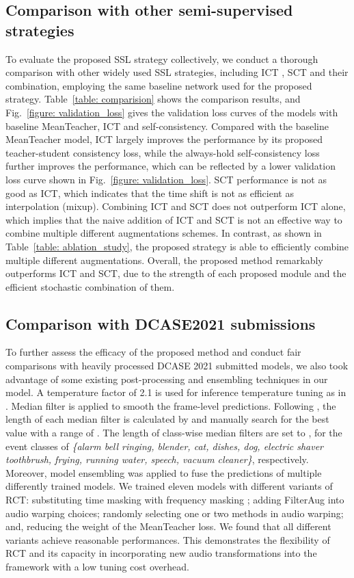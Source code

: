 \documentclass[a4paper]{article}
\begin{document}
\subsection{Comparison with other semi-supervised strategies}
To evaluate the proposed SSL strategy collectively, we conduct a thorough comparison with other widely used SSL strategies, including ICT \cite{verma2019interpolation}, SCT \cite{koh2021sound} and their combination, employing the same baseline network used for the proposed strategy. Table~\ref{table: comparision} shows the comparison results, and Fig.~\ref{figure: validation_loss} gives the validation loss curves of the models with baseline MeanTeacher, ICT and self-consistency. Compared with the baseline MeanTeacher model, ICT largely improves the performance by its proposed teacher-student consistency loss, while the always-hold self-consistency loss further improves the performance, which can be reflected by a lower validation loss curve shown in Fig.~\ref{figure: validation_loss}. SCT performance is not as good as ICT, which indicates that the time shift is not as efficient as interpolation (mixup). Combining ICT and SCT does not outperform ICT alone, which implies that the naive addition of ICT and SCT \cite{koh2021sound} is not an effective way to combine multiple different augmentations schemes. In contrast, as shown in Table~\ref{table: ablation_study}, the proposed strategy is able to efficiently combine multiple different augmentations. Overall, the proposed method remarkably outperforms ICT and SCT, due to the strength of each proposed module and the efficient stochastic combination of them. 

\subsection{Comparison with DCASE2021 submissions}
To further assess the efficacy of the proposed method and conduct fair comparisons with heavily processed DCASE 2021 submitted models, we also took advantage of some existing post-processing and ensembling techniques in our model. A temperature factor of 2.1 is used for inference temperature tuning as in \cite{Zheng2021}. Median filter is applied to smooth the frame-level predictions. Following \cite{Liu2020}, the length of each median filter is calculated by  and manually search for the best value with a range of . The length of class-wise median filters are set to , for the event classes of \emph{\{alarm bell ringing, blender, cat, dishes, dog, electric shaver toothbrush, frying, running water, speech, vacuum cleaner\}}, respectively. Moreover, model ensembling was applied to fuse the predictions of multiple differently trained models. We trained eleven models with different variants of RCT: substituting time masking with frequency masking \cite{park2019specaugment}; adding FilterAug \cite{Nam2021} into audio warping choices; randomly selecting one or two methods in audio warping; and, reducing the weight of the MeanTeacher loss. We found that all different variants achieve reasonable performances. This demonstrates the flexibility of RCT and its capacity in incorporating new audio transformations into the framework with a low tuning cost overhead.
\end{document}
